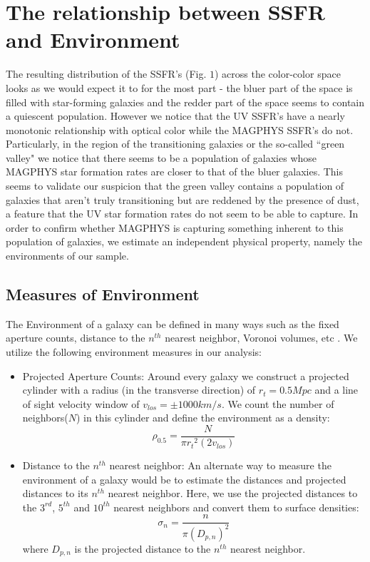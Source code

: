 \documentclass[iop]{emulateapj}
\begin{document}
\section{The relationship between SSFR and Environment}



The resulting distribution of the SSFR's (Fig. $1$) across the color-color space looks as we would expect it to for the most part - the bluer part of the space is filled with star-forming galaxies and the redder part of the space seems to contain a quiescent population. However we notice that the UV SSFR's have a nearly monotonic relationship with optical color while the MAGPHYS SSFR's do not. Particularly, in the region of the transitioning galaxies or the so-called ``green valley" we notice that there seems to be a population of galaxies whose MAGPHYS star formation rates are closer to that of the bluer galaxies. This seems to validate our suspicion that the green valley contains a population of galaxies that aren't truly transitioning but are reddened by the presence of dust, a feature that the UV star formation rates do not seem to be able to capture. In order to confirm whether MAGPHYS is capturing something inherent to this population of galaxies, we estimate an independent physical property, namely the environments of our sample.\\


\subsection{Measures of Environment}

The Environment of a galaxy can be defined in many ways such as the fixed aperture counts, distance to the $n^{th}$ nearest neighbor, Voronoi volumes, etc \cite[]{Coop06}. We utilize the following environment measures in our analysis:\\


\begin{itemize}
\item{Projected Aperture Counts: Around every galaxy we construct a projected cylinder with a radius (in the transverse direction) of $r_{t} = 0.5 Mpc$ and a line of sight velocity window of $v_{los} = \pm 1000 km/s$. We count the number of neighbors($N$) in this cylinder and define the environment as a density:
$$ \rho_{0.5} = \frac{N}{\pi {r_{t}}^{2} (2v_{los})} $$}
\item{Distance to the $n^{th}$ nearest neighbor: An alternate way to measure the environment of a galaxy would be to estimate the distances and projected distances to its $n^{th}$ nearest neighbor.  Here, we use the projected distances to the $3^{rd}$, $5^{th}$ and $10^{th}$ nearest neighbors and convert them to surface densities:
$$ \sigma_{n} = \frac{n}{\pi (D_{p,n})^{2}} $$ where $D_{p,n}$ is the projected distance to the $n^{th}$ nearest neighbor.}
\end{itemize} 
\end{document}
